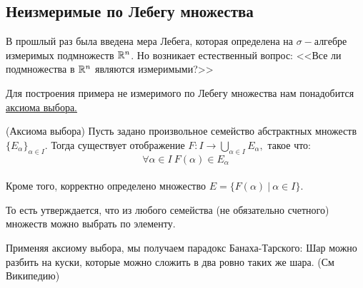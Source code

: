 \subsection{Неизмеримые по Лебегу множества}

В прошлый раз была введена мера Лебега, которая определена на $\sigma-$алгебре измеримых подмножеств $\mathbb{R}^n$. Но возникает естественный вопрос: <<Все ли подмножества в $\mathbb{R}^n$ являются измеримыми?>>

Для построения примера не измеримого по Лебегу множества нам понадобится \underline{аксиома выбора.}

\proposition (Аксиома выбора) Пусть задано произвольное семейство абстрактных множеств $\{E_{\alpha} \}_{\alpha \in I}.$ Тогда существует отображение  $F: I \rightarrow \bigcup\limits_{\alpha \in I} E_{\alpha},$ такое что:
$$\forall \alpha \in I \ F(\alpha) \in E_{\alpha}$$\\
Кроме того, корректно определено множество $E = \{F(\alpha) \ | \ \alpha \in I\}.$ 

То есть утверждается, что из любого семейства (не обязательно счетного) множеств можно выбрать по элементу.
\begin{fact}
    Применяя аксиому выбора, мы получаем парадокс Банаха-Тарского: Шар можно разбить на куски, которые можно сложить в два ровно таких же шара. (См Википедию)
\end{fact}

